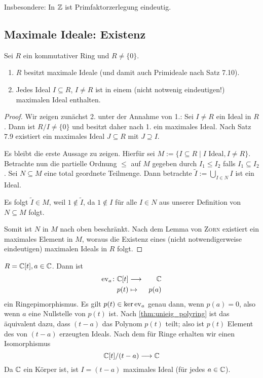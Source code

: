 \documentclass[12pt,a4paper]{scrartcl}
\begin{document}
\begin{bem}
	Insbesondere: In $\mathbb Z$ ist Primfaktorzerlegung \glqq eindeutig\grqq.
\end{bem}

\subsection{Maximale Ideale: Existenz}
\begin{satz}
	Sei $R$ ein kommutativer Ring %
	und $R \neq \{0\}$.
	\begin{enumerate}
		\item $R$ besitzt maximale Ideale (und damit auch Primideale nach Satz 7.10).
		\item Jedes Ideal $I\subseteq R$, $I \neq R$ ist in einem (nicht notwenig eindeutigen!) maximalen Ideal enthalten.
	\end{enumerate}
\end{satz}
\begin{proof}
	Wir zeigen zunächst 2. unter der Annahme von 1.: Sei $I\neq R$ ein Ideal in $R$. Dann ist $R/I \neq \{0\}$  und besitzt daher nach 1. ein maximales Ideal. Nach Satz 7.9 existiert ein maximales Ideal $J\subseteq R$ mit $J\supseteq I$.
	
	
	Es bleibt die erste Aussage zu zeigen. Hierfür sei $M := \{I\subseteq R\mid I\text{ Ideal}, I \neq R\}$. Betrachte nun die partielle Ordnung $\leq$ auf $M$ gegeben durch $I_1\leq I_2$ falls $I_1\subseteq I_2$. Sei $N\subseteq M$ eine total geordnete Teilmenge. Dann betrachte $\tilde{I} := \bigcup\limits_{I\in N} I$ ist ein Ideal.
	
	Es folgt $\tilde{I}\in M$, weil $1\notin \tilde{I}$, da $1\notin I$ für alle $ I\in N$ aus unserer Definition von $N\subseteq M$ folgt.
	
	Somit ist $N$ in $M$ nach oben beschränkt. Nach dem Lemma von \textsc{Zorn} existiert ein maximales Element in $M$, woraus die Existenz eines (nicht notwendigerweise eindeutigen) maximalen Ideals in $R$ folgt.
\end{proof}
\begin{bsp}
	$R = \mathbb C[t], a\in \mathbb C$. Dann ist
	\begin{eqnarray*}
		\operatorname{ev}_a\colon \mathbb C[t] & \longrightarrow & \mathbb C\\
		p(t) & \mapsto & p(a)
	\end{eqnarray*}
	ein Ringepimorphismus. Es gilt $p(t) \in \operatorname{ker}\operatorname{ev}_a$ genau dann, wenn $p(a) = 0$, also wenn $a$ eine Nullstelle von $p(t)$ ist. Nach \cref{thm:unieig_polyring} ist das äquivalent dazu, dass $(t-a)$ das Polynom $p(t)$ teilt; also ist $p(t)$ Element des von $(t-a)$ erzeugten Ideals. Nach dem  für Ringe erhalten wir einen Isomorphismus
	$$ \mathbb C[t]/(t-a) \longrightarrow \mathbb C$$
	Da $\mathbb C$ ein Körper ist, ist $I = (t-a)$ maximales Ideal (für jedes $a\in \mathbb C$).
\end{bsp}
\end{document}
